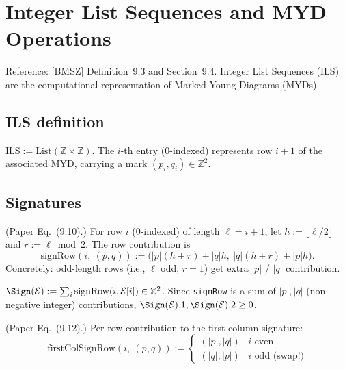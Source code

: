\chapter{Integer List Sequences and MYD Operations}
\label{chap:ils}

Reference: [BMSZ] Definition~9.3 and Section~9.4. Integer List Sequences (ILS)
are the computational representation of Marked Young Diagrams (MYDs).

\section{ILS definition}

\begin{definition}[ILS]
  \label{def:ILS}
  \leanok
  $\mathrm{ILS} := \mathrm{List}(\mathbb{Z} \times \mathbb{Z})$. The $i$-th entry
  (0-indexed) represents row $i + 1$ of the associated MYD, carrying a mark
  $(p_i, q_i) \in \mathbb{Z}^2$.
\end{definition}

\section{Signatures}

\begin{definition}
  \label{def:signRow}
  \leanok
  (Paper Eq.~(9.10).) For row $i$ (0-indexed) of length $\ell = i + 1$,
  let $h := \lfloor \ell / 2 \rfloor$ and $r := \ell \bmod 2$. The row contribution is
  \[
    \mathrm{signRow}(i,\ (p, q)) := \big(|p|(h + r) + |q| h,\ |q|(h + r) + |p| h\big).
  \]
  Concretely: odd-length rows (i.e., $\ell$ odd, $r = 1$) get extra $|p|$ / $|q|$ contribution.
\end{definition}

\begin{definition}
  \label{def:sign}
  \leanok
  $\Sign(\mathcal{E}) := \sum_{i} \mathrm{signRow}(i, \mathcal{E}[i]) \in \mathbb{Z}^2$.
  Since \texttt{signRow} is a sum of $|p|, |q|$ (non-negative integer)
  contributions, $\Sign(\mathcal{E}).1, \Sign(\mathcal{E}).2 \geq 0$.
\end{definition}

\begin{definition}
  \label{def:firstColSignRow}
  \leanok
  (Paper Eq.~(9.12).) Per-row contribution to the first-column signature:
  \[
    \mathrm{firstColSignRow}(i,\ (p, q)) :=
    \begin{cases}
      (|p|, |q|) & i\text{ even} \\
      (|q|, |p|) & i\text{ odd (swap!)}
    \end{cases}
  \]
\end{definition}

